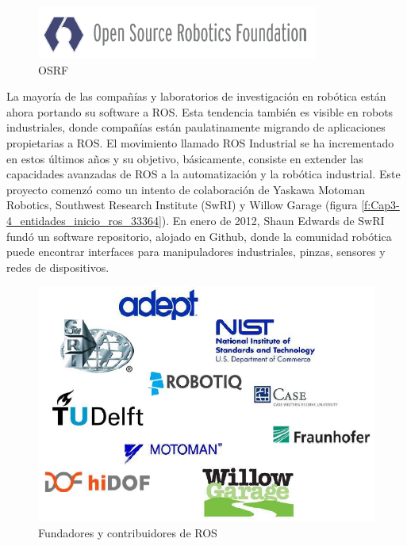         \begin{figure}[htbp]
            \centering
            \includegraphics[width=0.7\linewidth]{Main/Chapter3/Images3/3-4/entidade-asociadas-al-inicio-de-ros-3.png}
            \caption{OSRF \cite{osrf}} 
            \label{f:Cap3-4_entidades_inicio_ros_334}
        \end{figure}        
        
        \newpage
        
        La mayoría de las compañías y laboratorios de investigación en robótica están ahora portando su software a ROS. Esta tendencia también es visible en robots industriales, donde compañías están paulatinamente migrando de aplicaciones propietarias a ROS. El movimiento llamado ROS Industrial se ha incrementado en estos últimos años y su objetivo, básicamente, consiste en extender las capacidades avanzadas de ROS a la automatización y la robótica industrial. Este proyecto comenzó como un intento de colaboración de Yaskawa Motoman Robotics, Southwest Research Institute (SwRI) y Willow Garage (figura \eqref{f:Cap3-4_entidades_inicio_ros_33364}). En enero de 2012, Shaun Edwards de SwRI fundó un software repositorio, alojado en Github, donde la comunidad robótica puede encontrar interfaces para manipuladores industriales, pinzas, sensores y redes de dispositivos.
        
        \begin{figure}[htbp]
            \centering
            \includegraphics[width=0.65\linewidth]{Main/Chapter3/Images3/3-4/entidade-asociadas-al-inicio-de-ros-2.png}
            \caption{Fundadores y contribuidores de ROS} 
            \label{f:Cap3-4_entidades_inicio_ros_33364}
        \end{figure}    
        
